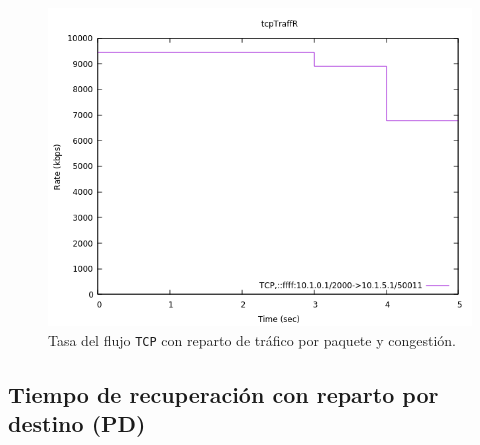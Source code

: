 \documentclass[11pt]{article}
\begin{document}
                \begin{figure}
                    \centering
                    \includegraphics[width=0.6\linewidth]{tcpTraffCongR.png}
                    \caption{Tasa del flujo \texttt{TCP} con reparto de tráfico por paquete y congestión.}
                    \label{fig:tcpTraffCongR}
                \end{figure}

            \subsection{Tiempo de recuperación con reparto por destino (PD)}
                
\end{document}
